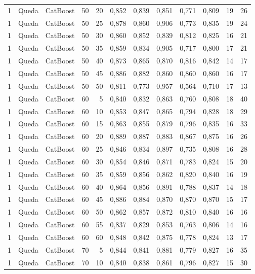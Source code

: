 \begin{longtable}{ccclrrrrrrrr}
1 & Queda & CatBoost & 50 & 20 & 0,852 & 0,839 & 0,851 & 0,771 & 0,809 & 19 & 26 \\
1 & Queda & CatBoost & 50 & 25 & 0,878 & 0,860 & 0,906 & 0,773 & 0,835 & 19 & 24 \\
1 & Queda & CatBoost & 50 & 30 & 0,860 & 0,852 & 0,839 & 0,812 & 0,825 & 16 & 21 \\
1 & Queda & CatBoost & 50 & 35 & 0,859 & 0,834 & 0,905 & 0,717 & 0,800 & 17 & 21 \\
1 & Queda & CatBoost & 50 & 40 & 0,873 & 0,865 & 0,870 & 0,816 & 0,842 & 14 & 17 \\
1 & Queda & CatBoost & 50 & 45 & 0,886 & 0,882 & 0,860 & 0,860 & 0,860 & 16 & 17 \\
1 & Queda & CatBoost & 50 & 50 & 0,811 & 0,773 & 0,957 & 0,564 & 0,710 & 17 & 13 \\
1 & Queda & CatBoost & 60 & 5 & 0,840 & 0,832 & 0,863 & 0,760 & 0,808 & 18 & 40 \\
1 & Queda & CatBoost & 60 & 10 & 0,853 & 0,847 & 0,865 & 0,794 & 0,828 & 18 & 29 \\
1 & Queda & CatBoost & 60 & 15 & 0,863 & 0,855 & 0,879 & 0,796 & 0,835 & 16 & 33 \\
1 & Queda & CatBoost & 60 & 20 & 0,889 & 0,887 & 0,883 & 0,867 & 0,875 & 16 & 26 \\
1 & Queda & CatBoost & 60 & 25 & 0,846 & 0,834 & 0,897 & 0,735 & 0,808 & 16 & 28 \\
1 & Queda & CatBoost & 60 & 30 & 0,854 & 0,846 & 0,871 & 0,783 & 0,824 & 15 & 20 \\
1 & Queda & CatBoost & 60 & 35 & 0,859 & 0,856 & 0,862 & 0,820 & 0,840 & 16 & 19 \\
1 & Queda & CatBoost & 60 & 40 & 0,864 & 0,856 & 0,891 & 0,788 & 0,837 & 14 & 18 \\
1 & Queda & CatBoost & 60 & 45 & 0,886 & 0,884 & 0,870 & 0,870 & 0,870 & 15 & 17 \\
1 & Queda & CatBoost & 60 & 50 & 0,862 & 0,857 & 0,872 & 0,810 & 0,840 & 16 & 16 \\
1 & Queda & CatBoost & 60 & 55 & 0,837 & 0,829 & 0,853 & 0,763 & 0,806 & 14 & 16 \\
1 & Queda & CatBoost & 60 & 60 & 0,848 & 0,842 & 0,875 & 0,778 & 0,824 & 13 & 17 \\
1 & Queda & CatBoost & 70 & 5 & 0,844 & 0,841 & 0,881 & 0,779 & 0,827 & 16 & 35 \\
1 & Queda & CatBoost & 70 & 10 & 0,840 & 0,838 & 0,861 & 0,796 & 0,827 & 15 & 30 \\

\end{longtable}
